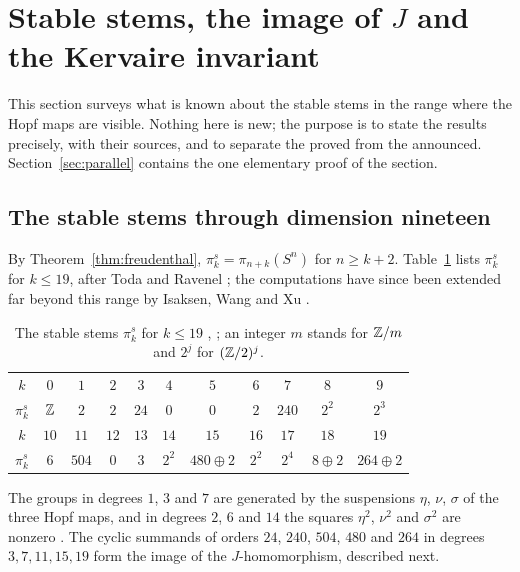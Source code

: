 \section{Stable stems, the image of \texorpdfstring{$J$}{J} and the Kervaire invariant}\label{ch:stable}

This section surveys what is known about the stable stems in the range where the Hopf maps are visible. Nothing here is new; the purpose is to state the results precisely, with their sources, and to separate the proved from the announced. Section~\ref{sec:parallel} contains the one elementary proof of the section.

\subsection{The stable stems through dimension nineteen}\label{sec:stems}

By Theorem~\ref{thm:freudenthal}, $\pi_k^s=\pi_{n+k}(S^n)$ for $n\ge k+2$. Table~\ref{tab:stable} lists $\pi_k^s$ for $k\le19$, after Toda \cite{Tod62} and Ravenel \cite[Table~A3.3]{Rav86}; the computations have since been extended far beyond this range by Isaksen, Wang and Xu \cite{IWX23}.

\begin{table}[htbp]
\centering
\small
\begin{tabular}{@{}c|cccccccccc@{}}
\toprule
$k$ & $0$ & $1$ & $2$ & $3$ & $4$ & $5$ & $6$ & $7$ & $8$ & $9$\\
$\pi_k^s$ & $\mathbb{Z}$ & $2$ & $2$ & $24$ & $0$ & $0$ & $2$ & $240$ & $2^2$ & $2^3$\\
\midrule
$k$ & $10$ & $11$ & $12$ & $13$ & $14$ & $15$ & $16$ & $17$ & $18$ & $19$\\
$\pi_k^s$ & $6$ & $504$ & $0$ & $3$ & $2^2$ & $480{\oplus}2$ & $2^2$ & $2^4$ & $8{\oplus}2$ & $264{\oplus}2$\\
\bottomrule
\end{tabular}
\caption{The stable stems $\pi_k^s$ for $k\le19$ \cite{Tod62}, \cite[Table~A3.3]{Rav86}; an integer $m$ stands for $\mathbb{Z}/m$ and $2^j$ for $(\mathbb{Z}/2)^j$.}
\label{tab:stable}
\end{table}

The groups in degrees $1$, $3$ and $7$ are generated by the suspensions $\eta$, $\nu$, $\sigma$ of the three Hopf maps, and in degrees $2$, $6$ and $14$ the squares $\eta^2$, $\nu^2$ and $\sigma^2$ are nonzero \cite{Tod62}. The cyclic summands of orders $24$, $240$, $504$, $480$ and $264$ in degrees $3,7,11,15,19$ form the image of the $J$-homomorphism, described next.

